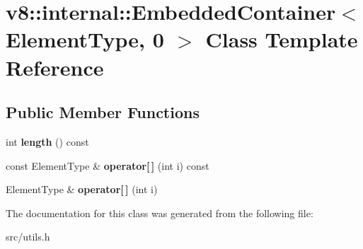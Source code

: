 \hypertarget{classv8_1_1internal_1_1_embedded_container_3_01_element_type_00_010_01_4}{}\section{v8\+:\+:internal\+:\+:Embedded\+Container$<$ Element\+Type, 0 $>$ Class Template Reference}
\label{classv8_1_1internal_1_1_embedded_container_3_01_element_type_00_010_01_4}
\subsection*{Public Member Functions}
\begin{DoxyCompactItemize}
\item 
\hypertarget{classv8_1_1internal_1_1_embedded_container_3_01_element_type_00_010_01_4_acd6978a5a99d0930017c275addf3474c}{}int {\bfseries length} () const \label{classv8_1_1internal_1_1_embedded_container_3_01_element_type_00_010_01_4_acd6978a5a99d0930017c275addf3474c}

\item 
\hypertarget{classv8_1_1internal_1_1_embedded_container_3_01_element_type_00_010_01_4_a8c61a28e064c368ff83540db79b2252f}{}const Element\+Type \& {\bfseries operator\mbox{[}$\,$\mbox{]}} (int i) const \label{classv8_1_1internal_1_1_embedded_container_3_01_element_type_00_010_01_4_a8c61a28e064c368ff83540db79b2252f}

\item 
\hypertarget{classv8_1_1internal_1_1_embedded_container_3_01_element_type_00_010_01_4_a2e68b4ec3f24b76990d72948a30e110f}{}Element\+Type \& {\bfseries operator\mbox{[}$\,$\mbox{]}} (int i)\label{classv8_1_1internal_1_1_embedded_container_3_01_element_type_00_010_01_4_a2e68b4ec3f24b76990d72948a30e110f}

\end{DoxyCompactItemize}


The documentation for this class was generated from the following file\+:\begin{DoxyCompactItemize}
\item 
src/utils.\+h\end{DoxyCompactItemize}
